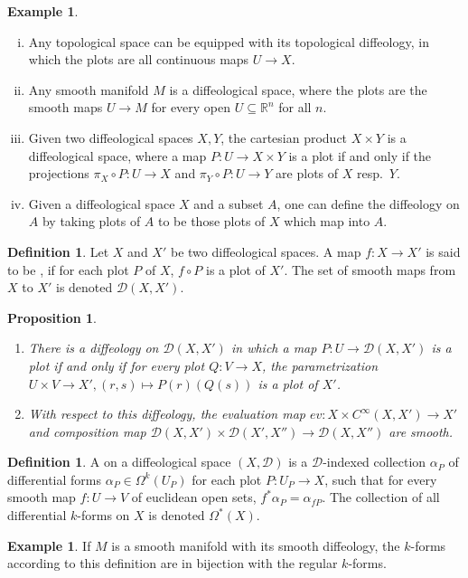 \documentclass{scrartcl}
\let\emph\relax
\theoremstyle{plain}
\newtheorem{proposition}[theorem]{Proposition}
\theoremstyle{definition}
\newtheorem{definition}[theorem]{Definition}
\newtheorem{example}[theorem]{Example}
\newcommand{\R}{\mathbb R}
\renewcommand{\subset}{\subseteq}
\newcommand{\comp}{\mathbin{\circ}}
\begin{document}
\begin{example}\begin{enumerate}[(i)]
    \item Any topological space can be equipped with its topological diffeology, in which the plots are all continuous maps $U\to X$.
    \item Any smooth manifold $M$ is a diffeological space, where the plots are the smooth maps $U\to M$ for every open $U\subset\R^n$ for all $n$.
    \item Given two diffeological spaces $X, Y$, the cartesian product $X\times Y$ is a diffeological space, where a map $P\colon U\to X\times Y$ is a plot if and only if the projections $\pi_X \comp P \colon U\to X$ and $\pi_Y\comp P\colon U\to Y$ are plots of $X$ resp.\ $Y$.
    \item Given a diffeological space $X$ and a subset $A$, one can define the diffeology on $A$ by taking plots of $A$ to be those plots of $X$ which map into $A$.
\end{enumerate}\end{example}
\begin{definition}
    Let $X$ and $X'$ be two diffeological spaces. A map $f\colon X\to X'$ is said to be \emph{smooth}, if for each plot $P$ of $X$, $f\comp P$ is a plot of $X'$. The set of smooth maps from $X$ to $X'$ is denoted $\mathcal D(X, X')$.
\end{definition}
\begin{proposition}\label{prop:diffeology-mapping-space}
    \begin{enumerate}
        \item There is a diffeology on $\mathcal D(X, X')$ in which a map $P\colon U\to \mathcal D(X, X')$ is a plot if and only if for every plot $Q\colon V\to X$, the parametrization $U\times V\to X', (r,s)\mapsto P(r)(Q(s))$ is a plot of $X'$. 
    
        \item With respect to this diffeology, the evaluation map $ev\colon X\times C^\infty(X, X') \to X'$ and composition map $\mathcal D(X, X')\times \mathcal D(X', X'')\to \mathcal D(X, X'')$ are smooth.
    \end{enumerate}
\end{proposition}

\begin{definition}
    A \emph{differential $k$-form} on a diffeological space $(X,\mathcal D)$ is a $\mathcal D$-indexed collection $\alpha_P$ of differential forms $\alpha_P\in \Omega^k(U_P)$ for each plot $P\colon U_P\to X$, such that for every smooth map $f\colon U\to V$ of euclidean open sets, $f^*\alpha_P = \alpha_{fP}$. The collection of all differential $k$-forms on $X$ is denoted $\Omega^*(X)$.
\end{definition}
\begin{example}
If $M$ is a smooth manifold with its smooth diffeology, the $k$-forms according to this definition are in bijection with the regular $k$-forms. 
\end{example}
\end{document}
